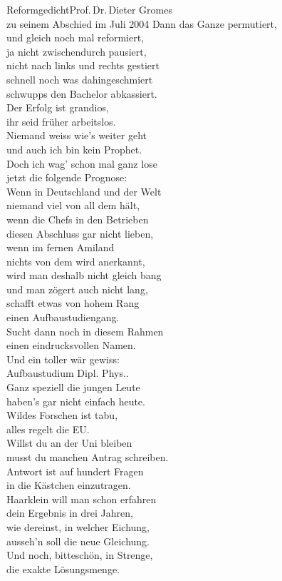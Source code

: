 \begin{lied*}{Reformgedicht}{Prof.\,Dr.\,Dieter Gromes\\zu seinem Abschied im Juli 2004}
Dann das Ganze permutiert,\\
und gleich noch mal reformiert,\\
ja nicht zwischendurch pausiert,\\
nicht nach links und rechts gestiert\\
schnell noch was dahingeschmiert\\
schwupps den Bachelor abkassiert.\\

Der Erfolg ist grandios,\\
ihr seid früher arbeitslos.\\

Niemand weiss wie's weiter geht\\
und auch ich bin kein Prophet.\\
Doch ich wag' schon mal ganz lose\\
jetzt die folgende Prognose:\\

Wenn in Deutschland und der Welt\\
niemand viel von all dem hält,\\
wenn die Chefs in den Betrieben\\
diesen Abschluss gar nicht lieben,\\
wenn im fernen Amiland\\
nichts von dem wird anerkannt,\\
wird man deshalb nicht gleich bang\\
und man zögert auch nicht lang,\\
schafft etwas von hohem Rang\\
einen \glqq Aufbaustudiengang\grqq .\\
Sucht dann noch in diesem Rahmen\\
einen eindrucksvollen Namen.\\
Und ein toller wär gewiss:\\
\glqq Aufbaustudium Dipl. Phys.\grqq.\\

Ganz speziell die jungen Leute\\
haben's gar nicht einfach heute.\\
Wildes Forschen ist tabu,\\
alles regelt die EU.\\

Willst du an der Uni bleiben\\
musst du manchen Antrag schreiben.\\
Antwort ist auf hundert Fragen\\
in die Kästchen einzutragen.\\
Haarklein will man schon erfahren\\
dein Ergebnis in drei Jahren,\\
wie dereinst, in welcher Eichung,\\
ausseh'n soll die neue Gleichung.\\
Und noch, bitteschön, in Strenge,\\
die exakte Lösungsmenge.\\


\end{lied*}
